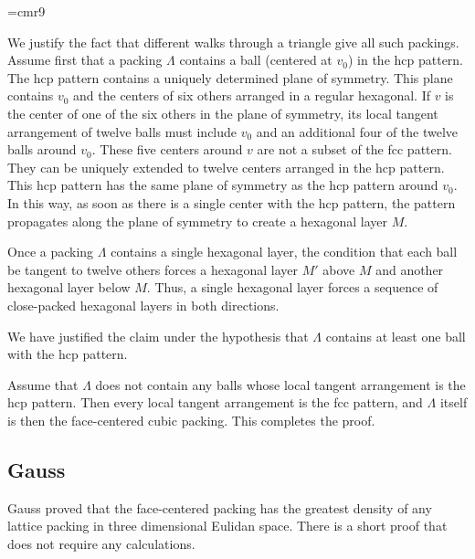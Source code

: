 {

\narrower

\font\ninerm=cmr9 \ninerm



We justify the fact that different walks through a triangle give all
such packings. Assume first that a packing $\Lambda$ contains a ball
(centered at $v_0$) in the hcp pattern. The hcp pattern contains a
uniquely determined plane of symmetry. This plane contains $v_0$ and
the centers of six others arranged in a regular hexagonal. If $v$ is
the center of one of the six others in the plane of symmetry, its
local tangent arrangement of twelve balls must include $v_0$ and an
additional four of the twelve balls around $v_0$. These five centers
around $v$ are not a subset of the fcc pattern. They can be uniquely
extended to twelve centers arranged in the hcp pattern. This hcp
pattern has the same plane of symmetry as the hcp pattern around
$v_0$. In this way, as soon as there is a single center with the hcp
pattern, the pattern propagates along the plane of symmetry to
create a hexagonal layer $M$.

Once a packing $\Lambda$ contains a single hexagonal layer, the
condition that each ball be tangent to twelve others forces a
hexagonal layer $M'$ above $M$ and another hexagonal layer below
$M$.  Thus, a single hexagonal layer forces a sequence of
close-packed hexagonal layers in both directions.

We have justified the claim under the hypothesis that $\Lambda$
contains at least one ball with the hcp pattern.

Assume that $\Lambda$ does not contain any balls whose local
tangent arrangement is the hcp pattern.  Then every local tangent
arrangement is the fcc pattern, and $\Lambda$ itself is then the
face-centered cubic packing.  This completes the proof.


}

\subsection{Gauss}

Gauss proved that the face-centered packing has the greatest density
of any lattice packing in three dimensional Eulidan space.  
There is a short proof that
does not require any calculations.

